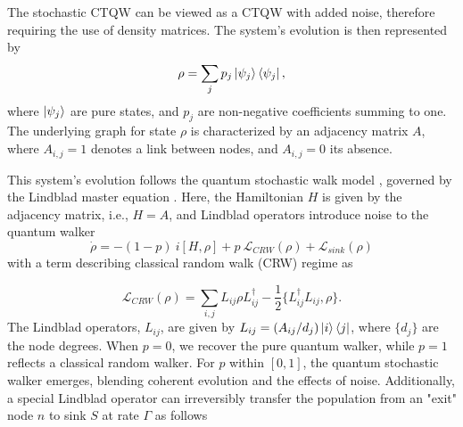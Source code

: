 \documentclass[../../main.tex]{subfiles}
\begin{document}
The stochastic CTQW can be viewed as a CTQW with added noise, therefore
requiring the use of density matrices. The system's evolution is then
represented by 
\begin{equation}
    \rho = \sum_j p_j\ket{\psi_j}\bra{\psi_j},
\end{equation}
where $\ket{\psi_j}$ are pure states, and $p_j$ are non-negative
coefficients summing to one. The underlying graph for state $\rho$ is
characterized by an adjacency matrix $A$, where $A_{i,j}=1$ denotes a link
between nodes, and $A_{i,j}=0$ its absence.


This system's evolution follows the quantum stochastic walk model
\cite{whitfield2010, Caruso2014}, governed by the Lindblad master equation
\cite{Lindblad1976}. Here, the Hamiltonian $H$ is given by the 
adjacency matrix, i.e., $H=A$, and Lindblad operators introduce noise to the
quantum walker
\begin{equation}
    {\dot \rho} = -(1-p)\ i[H,\rho] + p\  \mathcal{L}_{CRW} (\rho) + \mathcal{L}_{sink} (\rho)
    \label{densityEvolution}
\end{equation}
with a term describing classical random walk (CRW) regime as

\begin{equation}
    \mathcal{L}_{CRW} (\rho) = \sum_{i,j} L_{ij} \rho L_{ij}^{\dagger} - \frac{1}{2} \{L_{ij}^\dagger L_{ij}, \rho\}.
\end{equation}
The Lindblad operators, $L_{ij}$, are given by $L_{ij} =
(A_{ij}/d_j)\ket{i}\bra{j}$, where $\lbrace d_j \rbrace$ are the node degrees.
When $p=0$, we recover the pure quantum walker, while $p=1$ reflects a
classical random walker. For $p$ within $[0,1]$, the quantum stochastic walker
emerges, blending coherent evolution and the effects of noise. Additionally, a
special Lindblad operator can irreversibly transfer the population from an
"exit" node $n$ to sink $S$ at rate $\Gamma$ as follows
\end{document}
